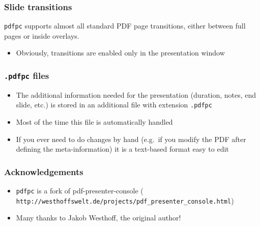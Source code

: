 \documentclass{beamer}
\newcommand{\singleitem}[1]{\begin{itemize}\item #1\end{itemize}}
\newcommand{\pdfpc}{\texttt{pdfpc}\xspace}
\newcommand{\opt}[1]{\texttt{#1}\xspace}
\begin{document}
\begin{frame}
  \frametitle{Slide transitions}

  \pdfpc supports almost all standard PDF page transitions, either between full
  pages or inside overlays.

  \singleitem{Obviously, transitions are enabled only in the presentation
    window}


\end{frame}

\begin{frame}
  \transpush[direction=180]
  \frametitle{\opt{.pdfpc} files}
  \begin{itemize}
    \item The additional information needed for the presentation (duration,
      notes, end slide, etc.) is stored in an additional file with extension
      \opt{.pdfpc}
    \item Most of the time this file is automatically handled
    \item If you ever need to do changes by hand (e.g.\ if you modify the PDF
      after defining the meta-information) it is a text-based format easy to
      edit
  \end{itemize}
\end{frame}

\begin{frame}[fragile]
  \frametitle{Acknowledgements}
  \begin{itemize}
    \item \pdfpc is a fork of pdf-presenter-console
      ({\footnotesize
        \verb+http://westhoffswelt.de/projects/pdf_presenter_console.html+})
    \item Many thanks to Jakob Westhoff, the original author!
  \end{itemize}
\end{frame}
\end{document}
